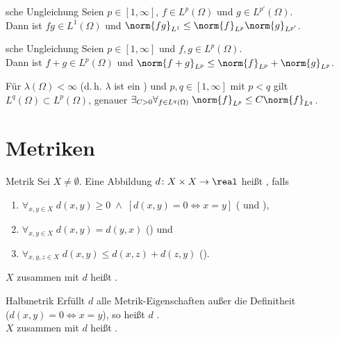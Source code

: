 \begin{Satz}{sche Ungleichung}
    Seien $p \in [1, \infty]$, $f \in L^p(\Omega)$ und $g \in L^{p'}(\Omega)$.\\
    Dann ist $fg \in L^1(\Omega)$ und $\norm{fg}_{L^1} \le \norm{f}_{L^p} \norm{g}_{L^{p'}}$.
\end{Satz}

\begin{Satz}{sche Ungleichung}
    Seien $p \in [1, \infty]$ und $f, g \in L^p(\Omega)$.\\
    Dann ist $f + g \in L^p(\Omega)$ und $\norm{f + g}_{L^p} \le \norm{f}_{L^p} + \norm{g}_{L^p}$.
\end{Satz}

\begin{Bem}
    Für $\lambda(\Omega) < \infty$ (d.\,h. $\lambda$ ist ein )
    und $p, q \in [1, \infty]$ mit $p < q$ gilt
    $L^q(\Omega) \subset L^p(\Omega)$, genauer
    $\exists_{C > 0} \forall_{f \in L^q(\Omega)}\; \norm{f}_{L^p} \le C \norm{f}_{L^q}$.
\end{Bem}

\section{%
    Metriken%
}

\begin{Def}{Metrik}
    Sei $X \not= \emptyset$.
    Eine Abbildung $d\colon X \times X \rightarrow \real$ heißt , falls
    \begin{enumerate}
        \item
        $\forall_{x, y \in X}\; d(x, y) \ge 0 \;\land\; [d(x, y) = 0 \iff x = y]$
        ( und ),

        \item
        $\forall_{x, y \in X}\; d(x, y) = d(y, x)$
        () und

        \item
        $\forall_{x, y, z \in X}\; d(x, y) \le d(x, z) + d(z, y)$
        ().
    \end{enumerate}
    $X$ zusammen mit $d$ heißt .
\end{Def}

\begin{Def}{Halbmetrik}
    Erfüllt $d$ alle Metrik-Eigenschaften außer die Definitheit\\
    ($d(x, y) = 0 \iff x = y$),
    so heißt $d$ .\\
    $X$ zusammen mit $d$ heißt .
\end{Def}

